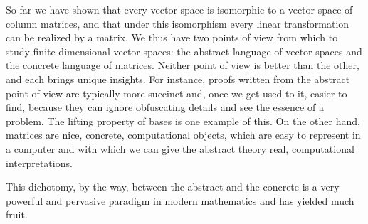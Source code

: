 \documentclass{memoir}
\begin{document}
So far we have shown that every vector space is isomorphic to a vector space of column matrices, and that under this isomorphism every linear transformation can be realized by a matrix. We thus have two points of view from which to study finite dimensional vector spaces: the abstract language of vector spaces and the concrete language of matrices. Neither point of view is better than the other, and each brings unique insights. For instance, proofs written from the abstract point of view are typically more succinct and, once we get used to it, easier to find, because they can ignore obfuscating details and see the essence of a problem. The lifting property of bases is one example of this. On the other hand, matrices are nice, concrete, computational objects, which are easy to represent in a computer and with which we can give the abstract theory real, computational interpretations.

This dichotomy, by the way, between the abstract and the concrete is a very powerful and pervasive paradigm in modern mathematics and has yielded much fruit.
\end{document}
